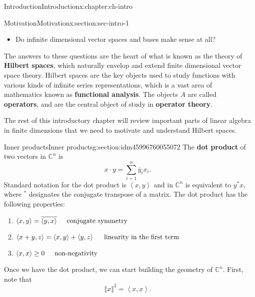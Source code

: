 \documentclass[oneside,10pt,]{book}
\newcommand{\terminology}[1]{\textbf{#1}}
\numberwithin{equation}{section}
\newcommand{\C}{\mathbb{C}}
\newcommand{\cc}[1]{\overline{#1}}
\newcommand{\norm}[1]{\left\Vert#1\right\Vert}
\newcommand{\ip}[2]{\left\langle #1, #2 \right\rangle}
\newcommand{\ad}{^\ast}
\numberwithin{equation}{section}
\begin{document}
\begin{chapterptx}{Introduction}{}{Introduction}{}{}{x:chapter:ch-intro}
\begin{sectionptx}{Motivation}{}{Motivation}{}{}{x:section:sec-intro-1}
\begin{itemize}[label=\textbullet]
\item{}Do infinite dimensional vector spaces and bases make sense at all?%
\end{itemize}
%
\par
The answers to these questions are the heart of what is known as the theory of \terminology{Hilbert spaces}, which naturally envelop and extend finite dimensional vector space theory. Hilbert spaces are the key objects used to study functions with various kinds of infinite series representations, which is a vast area of mathematics known as \terminology{functional analysis}. The objects \(A\) are called \terminology{operators}, and are the central object of study in \terminology{operator theory}.%
\par
The rest of this introductory chapter will review important parts of linear algebra in finite dimensions that we need to motivate and understand Hilbert spaces.%
\end{sectionptx}
%
%
\typeout{************************************************}
\typeout{************************************************}
%
\begin{sectionptx}{Inner products}{}{Inner products}{}{}{g:section:idm45996760055072}
The \terminology{dot product} of two vectors in \(\C^n\) is%
\begin{equation}
x \cdot y = \sum_{i=1}^n \cc y_i x_i.\label{x:men:def-dot}
\end{equation}
Standard notation for the dot product is \(\ip{x}{y}\) and in \(\C^n\) is equivalent to \(y\ad x\), where \(\ad\) designates the conjugate transpose of a matrix. The dot product has the following properties:%
\begin{enumerate}
\item{}\(\ip{x}{y} = \cc{\ip{y}{x}} \hspace{.2in} \text{conjugate symmetry}\)%
\item{}\(\ip{x + y}{z} = \ip{x}{y} + \ip{y}{z} \hspace{.2in} \text{linearity in the first term}\)%
\item{}\(\ip{x}{x} \geq 0 \hspace{.2in} \text{non-negativity}\)%
\end{enumerate}
%
\par
Once we have the dot product, we can start building the geometry of \(\C^n\). First, note that%
\begin{equation}
\norm{x}^2 = \ip{x}{x}.\label{g:men:idm45996759965248}
\end{equation}

\end{sectionptx}
\end{chapterptx}
\end{document}
